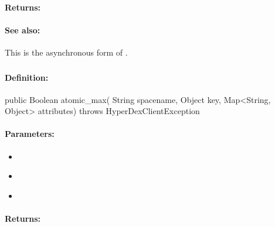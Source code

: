 \paragraph{Returns:}


\paragraph{See also:}  This is the asynchronous form of .

\pagebreak
\subsubsection{}
\label{api:java:atomic_max}


\paragraph{Definition:}
\begin{javacode}
public Boolean atomic_max(
        String spacename,
        Object key,
        Map<String, Object> attributes) throws HyperDexClientException
\end{javacode}

\paragraph{Parameters:}
\begin{itemize}[noitemsep]
\item {}\\

\item {}\\

\item {}\\

\end{itemize}

\paragraph{Returns:}


